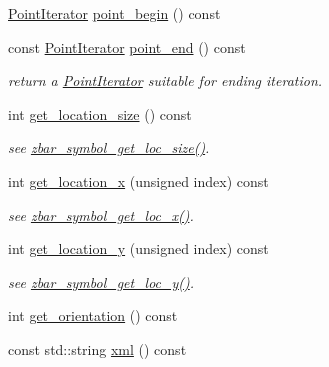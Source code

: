 \begin{DoxyCompactItemize}
\item 
\hyperlink{classzbar_1_1_symbol_1_1_point_iterator}{PointIterator} \hyperlink{classzbar_1_1_symbol_ae31c347e6a0ebc6f4d74901459143052}{point\_\-begin} () const 
\item 
\hypertarget{classzbar_1_1_symbol_ac45ac107e04227a2d9f054fb8d6f5396}{
const \hyperlink{classzbar_1_1_symbol_1_1_point_iterator}{PointIterator} \hyperlink{classzbar_1_1_symbol_ac45ac107e04227a2d9f054fb8d6f5396}{point\_\-end} () const }
\label{classzbar_1_1_symbol_ac45ac107e04227a2d9f054fb8d6f5396}

\begin{DoxyCompactList}\small\item\em return a \hyperlink{classzbar_1_1_symbol_1_1_point_iterator}{PointIterator} suitable for ending iteration. \end{DoxyCompactList}\item 
\hypertarget{classzbar_1_1_symbol_ae4e0bcba7f885e7b09b688730505f4ed}{
int \hyperlink{classzbar_1_1_symbol_ae4e0bcba7f885e7b09b688730505f4ed}{get\_\-location\_\-size} () const }
\label{classzbar_1_1_symbol_ae4e0bcba7f885e7b09b688730505f4ed}

\begin{DoxyCompactList}\small\item\em see \hyperlink{zbar_8h_af1a98f95d0c058ad356acb73089ec2eb}{zbar\_\-symbol\_\-get\_\-loc\_\-size()}. \end{DoxyCompactList}\item 
\hypertarget{classzbar_1_1_symbol_ad2e8a6cb6cdbe5287f2be94b2887079e}{
int \hyperlink{classzbar_1_1_symbol_ad2e8a6cb6cdbe5287f2be94b2887079e}{get\_\-location\_\-x} (unsigned index) const }
\label{classzbar_1_1_symbol_ad2e8a6cb6cdbe5287f2be94b2887079e}

\begin{DoxyCompactList}\small\item\em see \hyperlink{zbar_8h_a74dc54a422a63f57c24748e836016ecb}{zbar\_\-symbol\_\-get\_\-loc\_\-x()}. \end{DoxyCompactList}\item 
\hypertarget{classzbar_1_1_symbol_a2c8032cfb710c2f840f15961ca61fce6}{
int \hyperlink{classzbar_1_1_symbol_a2c8032cfb710c2f840f15961ca61fce6}{get\_\-location\_\-y} (unsigned index) const }
\label{classzbar_1_1_symbol_a2c8032cfb710c2f840f15961ca61fce6}

\begin{DoxyCompactList}\small\item\em see \hyperlink{zbar_8h_ac05f77f2065a1ffb8951703647af1579}{zbar\_\-symbol\_\-get\_\-loc\_\-y()}. \end{DoxyCompactList}\item 
int \hyperlink{classzbar_1_1_symbol_a117a243939d9b8b78859fb23fcb4d670}{get\_\-orientation} () const 
\item 
\hypertarget{classzbar_1_1_symbol_a718c35963549441d26f8e516fff77f8d}{
const std::string \hyperlink{classzbar_1_1_symbol_a718c35963549441d26f8e516fff77f8d}{xml} () const }
\label{classzbar_1_1_symbol_a718c35963549441d26f8e516fff77f8d}


\end{DoxyCompactItemize}
